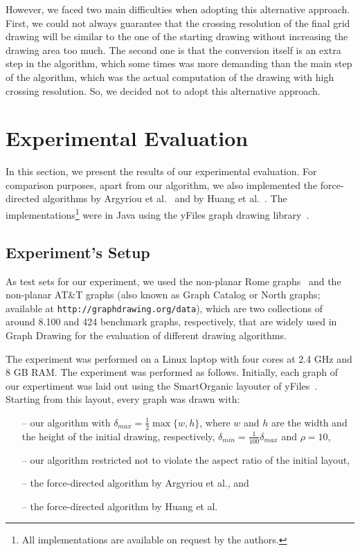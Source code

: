 \documentclass{comjnl}
\begin{document}
However, we faced two main difficulties when adopting this alternative approach. First, we could not always guarantee that the crossing resolution of the final grid drawing will be similar to the one of the starting drawing without increasing the drawing area too much. The second one is that the conversion itself is an extra step in the algorithm, which some times was more demanding than the main step of the algorithm, which was the actual computation of the drawing with high crossing resolution. So, we decided not to adopt this alternative approach.

\section{Experimental Evaluation}
\label{sec:experiments}

In this section, we present the results of our experimental evaluation. For comparison purposes, apart from our algorithm, we also implemented the force-directed algorithms by Argyriou et al.~\cite{DBLP:journals/cj/ArgyriouBS13} and by Huang et al.~\cite{DBLP:journals/vlc/HuangEHL13}. The implementations\footnote{All implementations are available on request by the authors.} were in Java using the yFiles graph drawing library~\cite{DBLP:books/sp/04/WieseE004}. 

\subsection{Experiment's Setup}
\label{ssec:setup}

As test sets for our experiment, we used the non-planar Rome graphs~\cite{DBLP:reference/crc/BattistaD13} and the non-planar AT\&T graphs (also known as Graph Catalog or North graphs; available at \texttt{http://graphdrawing.org/data}), which are two collections of around 8.100 and 424 benchmark graphs, respectively, that are widely used in Graph Drawing for the evaluation of different drawing algorithms. 

The experiment was performed on a Linux laptop with four cores at 2.4 GHz and 8 GB RAM. The experiment was performed as follows. Initially, each graph of our expertiment was laid out using the SmartOrganic layouter of yFiles~\cite{DBLP:books/sp/04/WieseE004}. Starting from this layout, every graph was drawn with:
%
\begin{itemize}
\item[--] our algorithm with $\delta_{max}=\frac{1}{2}\max\{w,h\}$, where $w$ and $h$ are the width and the height of the initial drawing, respectively, $\delta_{min}=\frac{1}{100}\delta_{max}$ and $\rho=10$,
\item[--] our algorithm restricted not to violate the aspect ratio of the initial layout, 
\item[--] the force-directed algorithm by Argyriou et al., and
\item[--] the force-directed algorithm by Huang et al.
\end{itemize}
\end{document}
